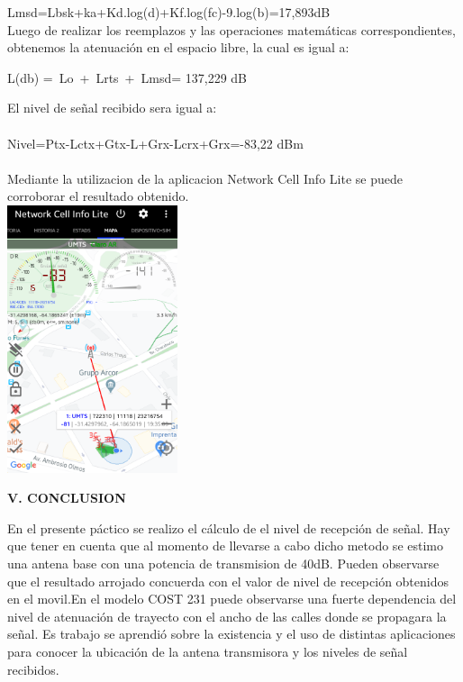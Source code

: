 \documentclass[10pt,a4paper]{article}
\begin{document}
\begin{multicols}{2}
Lmsd=Lbsk+ka+Kd.log(d)+Kf.log(fc)-9.log(b)=17,893dB\\

Luego de realizar los reemplazos y las operaciones matemáticas correspondientes, obtenemos la atenuación en el espacio libre, la cual es igual a:\\
\begin{center}

L(db) =\ Lo\ +\ Lrts\ +\ Lmsd= 137,229 dB
\end{center}
El nivel de señal recibido sera igual a:\\
\\
Nivel=Ptx-Lctx+Gtx-L+Grx-Lcrx+Grx=-83,22 dBm\\
\\
Mediante la utilizacion de la aplicacion Network Cell Info Lite se puede corroborar el resultado obtenido.\\

\includegraphics[width=5cm]{image/Screenshot_2020-06-26-19-35-34-1.png}

\begin{center}
\textbf{V. CONCLUSION}
\end{center}
En el presente páctico se realizo el cálculo de el nivel de recepción de señal.
Hay que tener en cuenta que al momento de llevarse a cabo dicho metodo se estimo una antena base con una potencia de transmision de 40dB.
Pueden observarse que el resultado  arrojado concuerda con el valor  de nivel de recepción obtenidos en el movil.En el 
modelo COST 231 puede observarse una fuerte dependencia del nivel de atenuación de trayecto con el ancho de las calles donde se propagara la señal.
Es trabajo se  aprendió  sobre la existencia y el uso de distintas aplicaciones  para conocer la ubicación de la antena transmisora y  los niveles de señal recibidos. 


\end{multicols}
\end{document}
